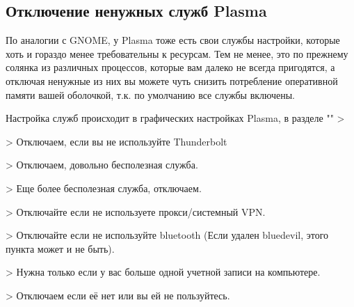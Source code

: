 \documentclass[letterpaper,10pt,russian,openany]{sphinxmanual}
\begin{document}
\ignorespaces 

\subsection{Отключение ненужных служб Plasma}
\label{\detokenize{source/de-optimizations:plasma}}\label{\detokenize{source/de-optimizations:disabling-plasma-daemons}}\label{\detokenize{source/de-optimizations:index-12}}
\sphinxAtStartPar
По аналогии с GNOME, у Plasma тоже есть свои службы настройки, которые хоть и гораздо менее требовательны к ресурсам.
Тем не менее, это по прежнему солянка из различных процессов, которые вам далеко не всегда пригодятся,
а отключая ненужные из них вы можете чуть снизить потребление оперативной памяти вашей оболочкой, т.к. по умолчанию все службы включены.

\sphinxAtStartPar
Настройка служб происходит в графических настройках Plasma, в разделе "" \sphinxhyphen{}> 

\noindent{}

\sphinxAtStartPar
{}

\sphinxAtStartPar
{} \sphinxhyphen{}> Отключаем, если вы не используйте Thunderbolt

\sphinxAtStartPar
{} \sphinxhyphen{}> Отключаем, довольно бесполезная служба.

\sphinxAtStartPar
{} \sphinxhyphen{}> Еще более бесполезная служба, отключаем.

\sphinxAtStartPar
{} \sphinxhyphen{}> Отключайте если не используете прокси/системный VPN.

\sphinxAtStartPar
{} \sphinxhyphen{}> Отключайте если не используйте bluetooth
(Если удален bluedevil, этого пункта может и не быть).

\sphinxAtStartPar
{} \sphinxhyphen{}> Нужна только если у вас больше одной учетной записи на компьютере.

\sphinxAtStartPar
{} \sphinxhyphen{}> Отключаем если её нет или вы ей не пользуйтесь.
\end{document}
